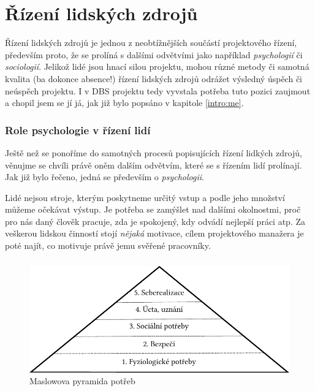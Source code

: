 \chapter{Řízení lidských zdrojů} \label{DBSmanagement}

Řízení lidských zdrojů je jednou z neobtížnějších součástí projektového řízení, především proto, že se prolíná s dalšími odvětvími jako například \emph{psychologií} či \emph{sociologií}. Jelikož lidé jsou hnací silou projektu, mohou různé metody či samotná kvalita (ba dokonce absence!) řízení lidských zdrojů odrážet výsledný úspěch či neúspěch projektu. I v DBS projektu tedy vyvstala potřeba tuto pozici zaujmout a chopil jsem se jí já, jak již bylo popsáno v kapitole \ref{intro:me}.

\subsection{Role psychologie v řízení lidí}
Ještě než se ponoříme do samotných procesů popisujících řízení lidkých zdrojů, věnujme se chvíli právě oněm dalším odvětvím, které se s řízením lidí prolínají. Jak již bylo řečeno, jedná se především o \emph{psychologii}.

Lidé nejsou stroje, kterým poskytneme určitý vstup a podle jeho množství můžeme očekávat výstup. Je potřeba se zamýšlet nad dalšími okolnostmi, proč pro nás daný člověk pracuje, zda je spokojený, kdy odvádí nejlepší práci atp. Za veškerou lidskou činností stojí \emph{nějaká} motivace, cílem projektového manažera je poté najít, co motivuje právě jemu svěřené pracovníky.

\paragraph{}
\begin{figure}[h]
\includegraphics[width=\textwidth]{../pdf/maslow.pdf}
\caption{Maslowova pyramida potřeb} \label{picture:maslow}
\end{figure}

